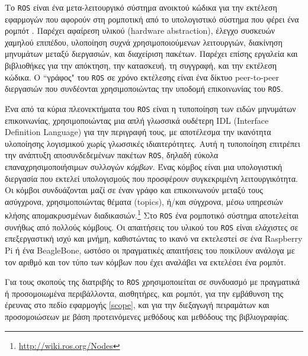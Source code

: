 Το \texttt{ROS} είναι ένα μετα-λειτουργικό σύστημα ανοικτού κώδικα για την
εκτέλεση εφαρμογών που αφορούν στη ρομποτική από το υπολογιστικό σύστημα που
φέρει ένα ρομπότ \cite{Ng2009}. Παρέχει αφαίρεση υλικού (hardware abstraction),
έλεγχο συσκευών χαμηλού επιπέδου, υλοποίηση συχνά χρησιμοποιούμενων
λειτουργιών, διακίνηση μηνυμάτων μεταξύ διεργασιών, και διαχείριση πακέτων.
Παρέχει επίσης εργαλεία και βιβλιοθήκες για την απόκτηση, την κατασκευή, τη
συγγραφή, και την εκτέλεση κώδικα. Ο ``γράφος" του \texttt{ROS} σε χρόνο
εκτέλεσης είναι ένα δίκτυο peer-to-peer διεργασιών που συνδέονται
χρησιμοποιώντας την υποδομή επικοινωνίας του \texttt{ROS}.

Ένα από τα κύρια πλεονεκτήματα του \texttt{ROS} είναι η τυποποίηση των ειδών
μηνυμάτων επικοινωνίας, χρησιμοποιώντας μια απλή γλωσσικά ουδέτερη IDL
(Interface Definition Language) για την περιγραφή τους, με αποτέλεσμα την
ικανότητα υλοποίησης λογισμικού χωρίς γλωσσικές ιδιαιτερότητες. Αυτή η
τυποποίηση επιτρέπει την ανάπτυξη αποσυνδεδεμένων πακέτων \texttt{ROS}, δηλαδή
εύκολα επαναχρησιμοποιήσιμων συλλογών \textit{κόμβων}. Ένας κόμβος είναι μια
υπολογιστική διεργασία που εκτελεί υπολογισμούς που προσφέρουν συγκεκριμένη
λειτουργικότητα. Οι κόμβοι συνδυάζονται μαζί σε έναν γράφο και επικοινωνούν
μεταξύ τους ασύγχρονα, χρησιμοποιώντας θέματα (topics), ή/και σύγχρονα, μέσω
υπηρεσιών κλήσης απομακρυσμένων
διαδικασιών.\footnote{\url{http://wiki.ros.org/Nodes}} Στο \texttt{ROS} ένα
ρομποτικό σύστημα αποτελείται συνήθως από πολλούς κόμβους. Οι απαιτήσεις του
υλικού του \texttt{ROS} είναι ελάχιστες σε επεξεργαστική ισχύ και μνήμη,
καθιστώντας το ικανό να εκτελεστεί σε ένα Raspberry Pi ή ένα BeagleBone, ωστόσο
οι πραγματικές απαιτήσεις του ποικίλουν ανάλογα με τον αριθμό και τον τύπο των
κόμβων που έχει αναλάβει να εκτελέσει ένα ρομπότ.

Για τους σκοπούς της διατριβής το \texttt{ROS} χρησιμοποιείται σε συνδυασμό με
πραγματικά ή προσομοιωμένα περιβάλλοντα, αισθητήρες, και ρομπότ, για την
εμβάθυνση της έρευνας στο πεδίο εφαρμογής \ref{scope}, και για την διεξαγωγή
πειραμάτων και προσομοιώσεων με βάση προτεινόμενες μεθόδους και μεθόδους της
βιβλιογραφίας.
